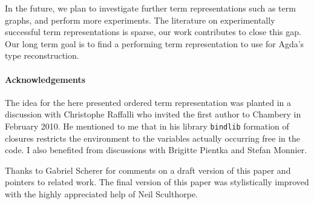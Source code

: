 \documentclass[submission,copyright,creativecommons]{eptcs}
\begin{document}
In the future, we plan to investigate further term representations
such as term graphs, and perform more experiments.  The literature on
experimentally successful term representations is sparse, our work
contributes to close this gap.  Our long term goal is to find a
performing term representation to use for Agda's type reconstruction.


\paragraph*{Acknowledgements}
The idea for the here presented ordered term representation was
planted in a discussion with Christophe Raffalli who invited the first
author to Chambery in February 2010.  He mentioned to me that in his
library \texttt{bindlib} formation of closures restricts the
environment to the variables actually occurring free in the code.  I
also benefited from discussions with Brigitte Pientka and Stefan Monnier.

Thanks to Gabriel Scherer for comments on a draft version of this
paper and pointers to related work. 
The final version of this paper was stylistically improved with the highly appreciated help of Neil Sculthorpe.





\end{document}
